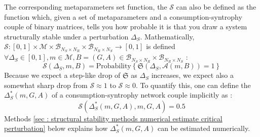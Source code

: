\documentclass[12pt, titlepage]{report}
\begin{document}
The corresponding metaparameters set function, the  $\mathcal{S}$
can also be defined as the function which, given a set of metaparameters and a consumption-syntrophy couple of binary matrices, tells you how probable it is that you draw a system structurally stable under a perturbation $\Delta_S$. Mathematically, $\mathcal{S} : [0,1] \times \mathcal{M} \times \mathcal{B}_{N_S \times N_R} \times \mathcal{B}_{N_R \times N_S} \rightarrow [0,1]$ is defined $\forall \Delta_S \in [0,1], m \in \mathcal{M}, B=(G,A) \in \mathcal{B}_{N_S \times N_R} \times \mathcal{B}_{N_R \times N_S}$ :
\begin{equation}
\boxed{
\mathcal{S}(\Delta_S, m, B)= \text{Probability}\left\{\mathfrak{S}(\Delta_S, \mathcal{A}(m, B))=1\right\}
}
\end{equation}
Because we expect a step-like drop of $\mathfrak{S}$ as $\Delta_S$ increases, we expect also a somewhat sharp drop from $\mathcal{S} \approx 1$ to $\mathcal{S} \approx 0$. To quantify this, one can define the  $\Delta_S^*(m,G,A)$ of a consumption-syntrophy network couple implicitly as :
\begin{equation}
\mathcal{S}(\Delta_S^*(m, G, A), m, G,A)=0.5
\end{equation}
Methods \ref{sec : structural stability methods numerical estimate critical perturbation} below explains how $\Delta_S^*(m, G,A)$ can be estimated numerically.
\end{document}
